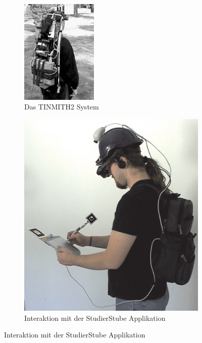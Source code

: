 \documentclass[a4paper]{scrreprt}
\begin{document}
\begin{figure}[h!]
	\centering
	\begin{subfigure}[t]{0.45\textwidth}
		\centering
		\includegraphics[keepaspectratio, width=0.4\textwidth]{tinmith2.png}
		\caption{Das TINMITH2 System \parencite{Thomas1999}}
	\end{subfigure}
	\quad
	\begin{subfigure}[t]{0.45\textwidth}
		\centering
		\includegraphics[keepaspectratio]{Studierstube2001.png}
		\caption{Interaktion mit der StudierStube Applikation \parencite{Reitmayr2001}}
	\end{subfigure}


\end{figure}
\end{document}
